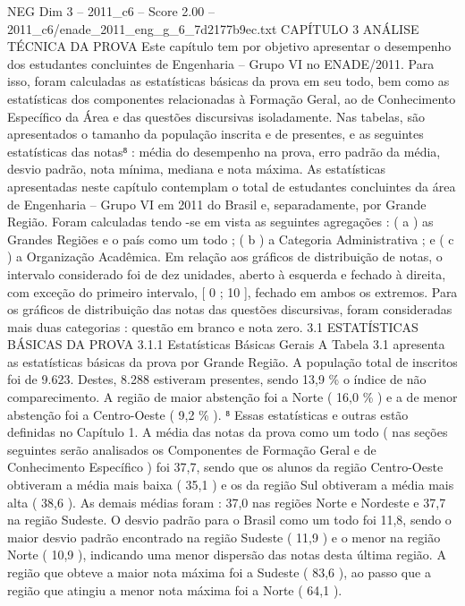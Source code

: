\begin{textsample}{NEG Dim 3 – 2011\_c6 – Score 2.00 – 2011\_c6/enade\_2011\_eng\_g\_6\_7d2177b9ec.txt}  \label{ex:f3_neg_084}
CAPÍTULO 3 ANÁLISE TÉCNICA DA PROVA Este capítulo tem por objetivo apresentar o desempenho dos estudantes concluintes de Engenharia – Grupo VI no ENADE/2011.
Para isso, foram calculadas as estatísticas básicas da prova em seu todo, bem como as estatísticas dos componentes relacionadas à Formação Geral, ao de Conhecimento Específico da Área e das questões discursivas isoladamente.
Nas tabelas, são apresentados o tamanho da população inscrita e de presentes, e as seguintes estatísticas das notas⁸ : média do desempenho na prova, erro padrão da média, desvio padrão, nota mínima, mediana e nota máxima.
As estatísticas apresentadas neste capítulo contemplam o total de estudantes concluintes da área de Engenharia – Grupo VI em 2011 do Brasil e, separadamente, por Grande Região.
Foram calculadas tendo -se em vista as seguintes agregações : ( a ) as Grandes Regiões e o país como um todo ; ( b ) a Categoria Administrativa ; e ( c ) a Organização Acadêmica.
Em relação aos gráficos de distribuição de notas, o intervalo considerado foi de dez unidades, aberto à esquerda e fechado à direita, com exceção do primeiro intervalo, [ 0 ; 10 ], fechado em ambos os extremos.
Para os gráficos de distribuição das notas das questões discursivas, foram consideradas mais duas categorias : questão em branco e nota zero. 3.1 ESTATÍSTICAS BÁSICAS DA PROVA 3.1.1 Estatísticas Básicas Gerais A Tabela 3.1 apresenta as estatísticas básicas da prova por Grande Região.
A população total de inscritos foi de 9.623.
Destes, 8.288 estiveram presentes, sendo 13,9 \% o índice de não comparecimento.
A região de maior abstenção foi a Norte ( 16,0 \% ) e a de menor abstenção foi a Centro-Oeste ( 9,2 \% ). ⁸ Essas estatísticas e outras estão definidas no Capítulo 1.
A média das notas da prova como um todo ( nas seções seguintes serão analisados os Componentes de Formação Geral e de Conhecimento Específico ) foi 37,7, sendo que os alunos da região Centro-Oeste obtiveram a média mais baixa ( 35,1 ) e os da região Sul obtiveram a média mais alta ( 38,6 ).
As demais médias foram : 37,0 nas regiões Norte e Nordeste e 37,7 na região Sudeste.
O desvio padrão para o Brasil como um todo foi 11,8, sendo o maior desvio padrão encontrado na região Sudeste ( 11,9 ) e o menor na região Norte ( 10,9 ), indicando uma menor dispersão das notas desta última região.
A região que obteve a maior nota máxima foi a Sudeste ( 83,6 ), ao passo que a região que atingiu a menor nota máxima foi a Norte ( 64,1 ).

\end{textsample}
